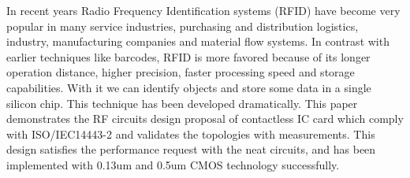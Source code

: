 In recent years Radio Frequency Identification systems (RFID) have become very popular in many service industries, purchasing and distribution logistics, industry, manufacturing companies and material flow systems. In contrast with earlier techniques like barcodes, RFID is more favored because of its longer operation distance, higher precision, faster processing speed and storage capabilities. With it we can identify objects and store some data in a single silicon chip. This technique has been developed dramatically. This paper demonstrates the RF circuits design proposal of contactless IC card which comply with ISO/IEC14443-2 and validates the topologies with measurements. This design satisfies the performance request with the neat circuits, and has been implemented with 0.13um and 0.5um CMOS technology successfully.